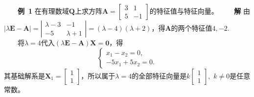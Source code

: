 \documentclass[compress,mathserif,cjk]{beamer}
\theoremstyle{remark}
\numberwithin{equation}{section}
\newcommand{\hei}{\bf}      %
\begin{document}
\begin{CJK}{UTF8}{gbsn}
\begin{frame}
 \ \ \ \ {\hei 例~1} 在有理数域$\bm Q$上求方阵$\bm A=\left[\begin{matrix}3&1\\5&-1\end{matrix}\right]$的特征值与特征向量。
 \pause\vskip 10pt
 \ \ \ \ {\hei 解} 由$|\lambda\bm E-\bm A|=\left|\begin{matrix}\lambda-3&-1\\-5&\lambda+1\end{matrix}\right|=(\lambda-4)(\lambda+2)$，得$\bm A$的两个特征值$4,-2$.
 \pause\vskip 5pt
 \ \ \ \ 将$\lambda=4$代入$(\lambda\bm E-\bm A)\bm X=\bm 0$，得
 $$\left\{\begin{array}{r}
 x_1-x_2=0,\\-5x_1+5x_2=0.
 \end{array}\right.$$
 其基础解系是$\bm X_1=\left[\begin{matrix}1\\1\end{matrix}\right]$，所以属于$\lambda=4$的全部特征向量是$k\left[\begin{matrix}1\\1\end{matrix}\right],$ $k\neq0$是任意常数。
\end{frame}


\end{CJK}
\end{document}
